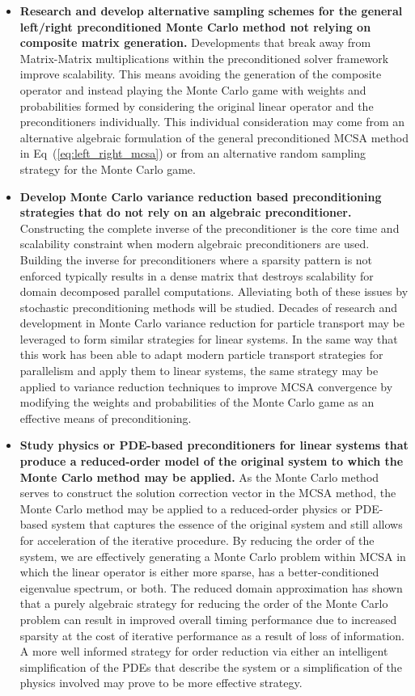 \begin{itemize}
\item \textbf{Research and develop alternative sampling schemes for
  the general left/right preconditioned Monte Carlo method not relying
  on composite matrix generation.} Developments that break away from
  Matrix-Matrix multiplications within the preconditioned solver
  framework improve scalability. This means avoiding the generation of
  the composite operator and instead playing the Monte Carlo game with
  weights and probabilities formed by considering the original linear
  operator and the preconditioners individually. This individual
  consideration may come from an alternative algebraic formulation of
  the general preconditioned MCSA method in
  Eq~(\ref{eq:left_right_mcsa}) or from an alternative random sampling
  strategy for the Monte Carlo game.
\item \textbf{Develop Monte Carlo variance reduction based
  preconditioning strategies that do not rely on an algebraic
  preconditioner.}  Constructing the complete inverse of the
  preconditioner is the core time and scalability constraint when
  modern algebraic preconditioners are used. Building the inverse for
  preconditioners where a sparsity pattern is not enforced typically
  results in a dense matrix that destroys scalability for domain
  decomposed parallel computations. Alleviating both of these issues
  by stochastic preconditioning methods will be studied. Decades of
  research and development in Monte Carlo variance reduction for
  particle transport \cite{booth_1994} may be leveraged to form
  similar strategies for linear systems. In the same way that this
  work has been able to adapt modern particle transport strategies for
  parallelism and apply them to linear systems, the same strategy may
  be applied to variance reduction techniques to improve MCSA
  convergence by modifying the weights and probabilities of the Monte
  Carlo game as an effective means of preconditioning.
\item \textbf{Study physics or PDE-based preconditioners for linear
  systems that produce a reduced-order model of the original system to
  which the Monte Carlo method may be applied.} As the Monte Carlo
  method serves to construct the solution correction vector in the
  MCSA method, the Monte Carlo method may be applied to a
  reduced-order physics or PDE-based system that captures the essence
  of the original system and still allows for acceleration of the
  iterative procedure. By reducing the order of the system, we are
  effectively generating a Monte Carlo problem within MCSA in which
  the linear operator is either more sparse, has a better-conditioned
  eigenvalue spectrum, or both. The reduced domain approximation has
  shown that a purely algebraic strategy for reducing the order of the
  Monte Carlo problem can result in improved overall timing
  performance due to increased sparsity at the cost of iterative
  performance as a result of loss of information. A more well informed
  strategy for order reduction via either an intelligent
  simplification of the PDEs that describe the system or a
  simplification of the physics involved may prove to be more
  effective strategy.
\end{itemize}

